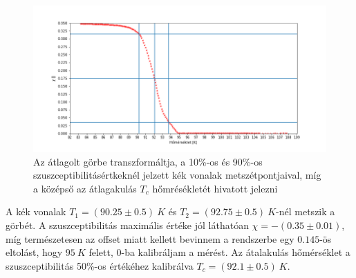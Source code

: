 \documentclass[a4paper,12pt]{article}
\begin{document}
\vspace{2mm}

\begin{figure}[!htb]
\centering
\includegraphics[width=1\textwidth]{szuszcepti.png}
\caption{Az átlagolt görbe transzformáltja, a 10\%-os és 90\%-os szuszceptibilitásértkeknél jelzett kék vonalak metszétpontjaival, míg a középső az átlagakulás $T_{c}$ hőmrésékletét hivatott jelezni}
\end{figure}

\vspace{2mm}

\par A kék vonalak $T_{1} = (90.25 \pm 0.5) ~K$ és $T_{2} = (92.75 \pm 0.5) ~K$-nél metszik a görbét. A szuszceptibilitás maximális értéke jól láthatóan $ \chi = -( 0.35 \pm 0.01) $, míg természetesen az offset miatt kellett bevinnem a rendszerbe egy $0.145$-ös eltolást, hogy $95~K$ felett, $0$-ba kalibráljam a mérést. Az átalakulás hőmérséklet a szuszceptibilitás 50\%-os értékéhez kalibrálva $T_{c} = (92.1 \pm 0.5) ~K$.
\end{document}
